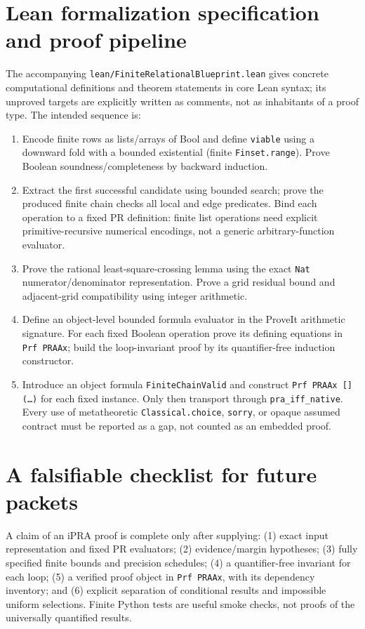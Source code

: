 \documentclass[11pt]{article}
\begin{document}
\section{Lean formalization specification and proof pipeline}
The accompanying \texttt{lean/FiniteRelationalBlueprint.lean} gives concrete computational definitions and theorem statements in core Lean syntax; its unproved targets are explicitly written as comments, not as inhabitants of a proof type. The intended sequence is:
\begin{enumerate}
\item Encode finite rows as lists/arrays of Bool and define \texttt{viable} using a downward fold with a bounded existential (finite \texttt{Finset.range}). Prove Boolean soundness/completeness by backward induction.
\item Extract the first successful candidate using bounded search; prove the produced finite chain checks all local and edge predicates. Bind each operation to a fixed PR definition: finite list operations need explicit primitive-recursive numerical encodings, not a generic arbitrary-function evaluator.
\item Prove the rational least-square-crossing lemma using the exact \texttt{Nat} numerator/denominator representation. Prove a grid residual bound and adjacent-grid compatibility using integer arithmetic.
\item Define an object-level bounded formula evaluator in the ProveIt arithmetic signature. For each fixed Boolean operation prove its defining equations in \texttt{Prf PRAAx}; build the loop-invariant proof by its quantifier-free induction constructor.
\item Introduce an object formula \texttt{FiniteChainValid} and construct \texttt{Prf PRAAx [] (\dots)} for each fixed instance. Only then transport through \texttt{pra\_iff\_native}. Every use of metatheoretic \texttt{Classical.choice}, \texttt{sorry}, or opaque assumed contract must be reported as a gap, not counted as an embedded proof.
\end{enumerate}

\section{A falsifiable checklist for future packets}
A claim of an iPRA proof is complete only after supplying: (1) exact input representation and fixed PR evaluators; (2) evidence/margin hypotheses; (3) fully specified finite bounds and precision schedules; (4) a quantifier-free invariant for each loop; (5) a verified proof object in \texttt{Prf PRAAx}, with its dependency inventory; and (6) explicit separation of conditional results and impossible uniform selections. Finite Python tests are useful smoke checks, not proofs of the universally quantified results.
\end{document}
